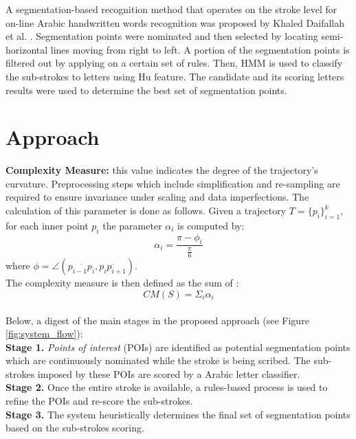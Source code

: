 \documentclass[10pt, conference, compsocconf]{IEEEtran}
\begin{document}
A segmentation-based recognition method that operates on the stroke level for on-line Arabic handwritten words recognition was proposed by Khaled Daifallah et al. \cite{daifallah2009recognition}. 
Segmentation points were nominated and then selected by locating semi-horizontal lines moving from right to left. 
A portion of the segmentation points is filtered out by applying on a certain set of rules. 
Then, HMM is used to classify the sub-strokes to letters using Hu feature. 
The candidate and its scoring letters results were used to determine the best set of segmentation points.\\


\section{Approach}
\label{sec:approach}

\textbf{Complexity Measure:} this value indicates the degree of the trajectory's curvature. 
Preprocessing steps which include simplification and re-sampling are required to ensure invariance under scaling and data imperfections. 
The calculation of this parameter is done as follows. Given a trajectory $T=\{p_i\}_{i=1}^{k}$, for each inner point $p_i$ the parameter $\alpha_{i}$ is computed by:
\begin{equation}
 \alpha_{i}=\frac{\pi-\phi_{i}}{\frac{\pi}{6}}
\end{equation}
where $\phi=\angle(\overline{p_{i-1}p_{i}},\overline{p_{i}p_{i+1}})$.\\ 
The complexity measure is then defined as the sum of :
\begin{equation}
CM(S)=\Sigma_{i}\alpha_{i}
\end{equation}\\

{\color{blue}
Below, a digest of the main stages in the proposed approach (see Figure \ref{fig:system_flow}):\\
\textbf{Stage 1.}  \emph{Points of interest} (POIs) are identified as potential segmentation points which are continuously nominated while the stroke is being scribed. The sub-strokes imposed by these POIs are scored by a Arabic letter classifier.\\
\textbf{Stage 2.} Once the entire stroke is available, a rules-based process is used to refine the POIs and re-score the sub-strokes.\\
\textbf{Stage 3.} The system heuristically determines the final set of segmentation points based on the sub-strokes scoring.}\\
\end{document}
